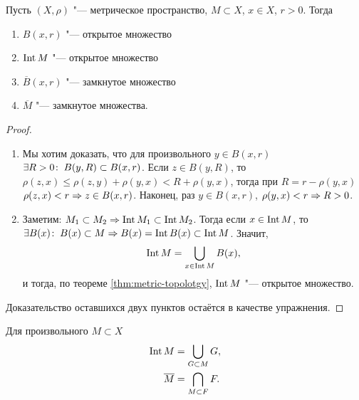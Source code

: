 \documentclass[main]{subfiles}
\begin{document}
\begin{theorem}
  Пусть \( (X, \rho) \) "--- метрическое пространство,
  \( M \subset X \), \( x \in X \), \( r > 0 \).
  Тогда
  \begin{enumerate}
    \item \( B(x, r) \) "--- открытое множество
    \item \( \operatorname{Int} M \) "--- открытое множество
    \item \( \overline{B}(x, r) \) "--- замкнутое множество
    \item  \( \overline{M} \) "--- замкнутое множества.
  \end{enumerate}
\end{theorem}
\begin{proof}~
  \begin{enumerate}
    \item Мы хотим доказать, что для произвольного \( y \in B(x, r) \)
      \( \exists R > 0 \colon \: B(y, R) \subset B(x, r) \).
      Если \( z \in B(y, R) \), то
      \( \rho(z, x) \le \rho(z, y) + \rho(y, x) < R + \rho(y, x) \),
      тогда при \( R = r - \rho(y, x) \) \( \rho(z, x) < r \Rightarrow z \in B(x, r) \).
      Наконец, раз \( y \in B(x, r) \), \( \rho(y, x) < r \Rightarrow R > 0 \).

    \item Заметим: \( M_1 \subset M_2 \Rightarrow \operatorname{Int} M_1 \subset \operatorname{Int} M_2 \).
      Тогда если \( x \in \operatorname{Int} M \), то
      \( \exists B(x) \colon \: B(x) \subset M \Rightarrow
      B(x) = \operatorname{Int} B(x) \subset \operatorname{Int} M \).
      Значит,
      \[ \operatorname{Int} M = \bigcup_{x \in \operatorname{Int} M} B(x), \]
      и тогда, по теореме \ref{thm:metric-topolotgy},
      \( \operatorname{Int} M \) "--- открытое множество.
  \end{enumerate}
  Доказательство оставшихся двух пунктов остаётся в качестве упражнения.
\end{proof}

\begin{remark}
  Для произвольного \( M \subset X \)
  \begin{align}
    \operatorname{Int} M       &= \bigcup_{G \subset M} G, \\
    \overline{M} &= \bigcap_{M \subset F} F.
  \end{align}
\end{remark}
\end{document}
